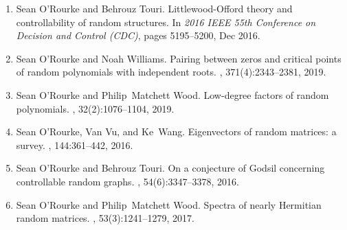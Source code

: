\documentclass[letterpaper]{article}
\begin{document}
\begin{enumerate}
	\item Sean O'Rourke and Behrouz Touri.
	\newblock Littlewood-Offord theory and controllability of random structures.
	\newblock In {\em 2016 IEEE 55th Conference on Decision and Control (CDC)}, pages 5195--5200, Dec 2016.
	\item Sean O'Rourke and Noah Williams.
	\newblock Pairing between zeros and critical points of random polynomials with independent roots.
	, 371(4):2343--2381, 2019.
	\item Sean O'Rourke and Philip~Matchett Wood.
	\newblock Low-degree factors of random polynomials.
	, 32(2):1076--1104, 2019.
	\item Sean O'Rourke, Van Vu, and Ke~Wang.
	\newblock Eigenvectors of random matrices: a survey.
	, 144:361--442, 2016.
	\item Sean O'Rourke and Behrouz Touri.
	\newblock On a conjecture of {G}odsil concerning controllable random graphs.
	, 54(6):3347--3378, 2016.
	\item Sean O'Rourke and Philip~Matchett Wood.
	\newblock Spectra of nearly {H}ermitian random matrices.
	, 53(3):1241--1279, 2017.


\end{enumerate}
\end{document}
